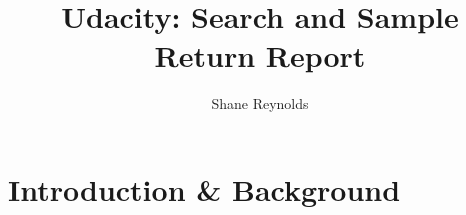 \documentclass[a4paper]{article}
\begin{document}
\title{Udacity: Search and Sample Return Report}
\author{Shane Reynolds}
\maketitle

\tableofcontents

\newpage

\section{Introduction \& Background}
\end{document}
